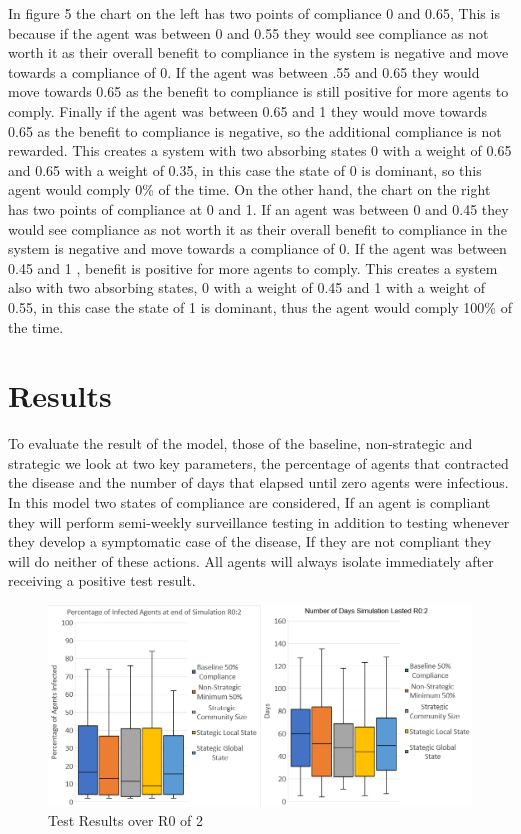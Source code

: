 \documentclass{article}
\begin{document}
In figure 5 the chart on the left has two points of compliance 0 and 0.65, This is because if the agent was between 0 and 0.55 they would see compliance as not worth it as their overall benefit to compliance in the system is negative and move towards a compliance of 0. If the agent was between .55 and 0.65 they would move towards 0.65 as the benefit to compliance is still positive for more agents to comply. Finally if the agent was between 0.65 and 1 they would move towards 0.65 as the benefit to compliance is negative, so the additional compliance is not rewarded. This creates a system with two absorbing states 0 with a weight of 0.65 and 0.65 with a weight of 0.35, in this case the state of 0 is dominant, so this agent would comply 0\% of the time. \newline\newline
On the other hand, the chart on the right has two points of compliance at 0 and 1. If an agent was between 0 and 0.45 they would see compliance as not worth it as their overall benefit to compliance in the system is negative and move towards a compliance of 0. If the agent was between 0.45 and 1 , benefit is positive for more agents to comply. This creates a system also with two absorbing states, 0 with a weight of 0.45 and 1 with a weight of 0.55, in this case the state of 1 is dominant, thus the agent would comply 100\% of the time.
\newpage

\section{Results}

To evaluate the result of the model, those of the baseline, non-strategic and strategic we look at two key parameters, the percentage of agents that contracted the disease and the number of days that elapsed until zero agents were infectious. In this model two states of compliance are considered, If an agent is compliant they will perform semi-weekly surveillance testing in addition to testing whenever they develop a symptomatic case of the disease, If they are not compliant they will do neither of these actions. All agents will always isolate immediately after receiving a positive test result. \newline




\begin{figure}[h!]
\centering
\includegraphics[width=\textwidth]{5}
\caption{Test Results over R0 of 2}
\end{figure}
\end{document}
